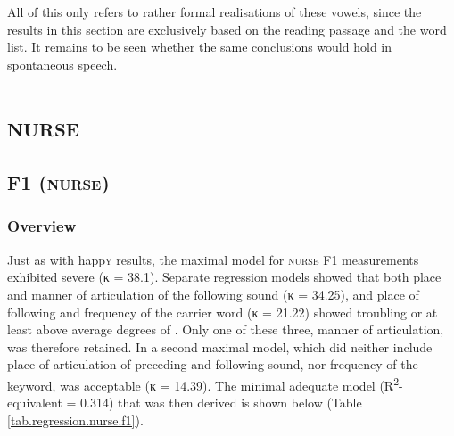 All of this only refers to rather formal realisations of these vowels, since the results in this section are exclusively based on the reading passage and the word list.
It remains to be seen whether the same conclusions would hold in spontaneous speech.

\section{\textrm{\textsc{nurse}}}
\label{sec.prod.res.vow.nurse}

\subsection{F1 (\textrm{\textsc{nurse}})}
\label{sec.prod.res.vow.nurse.f1}

\subsubsection{Overview}
\label{sec.prod.res.vow.nurse.f1.overview}

Just as with happ\textsc{y} results, the maximal model for \textsc{nurse} F1 measurements exhibited severe  (κ = 38.1).
Separate regression models showed that both place and manner of articulation of the following sound (κ = 34.25), and place of following  and frequency of the carrier word (κ = 21.22) showed troubling or at least above average degrees of .
Only one of these three, manner of articulation, was therefore retained.
In a second maximal model, which did neither include place of articulation of preceding and following sound, nor frequency of the keyword,  was acceptable (κ = 14.39).
The minimal adequate model (R\textsuperscript{2}-equivalent = 0.314) that was then derived is shown below (Table \ref{tab.regression.nurse.f1}).

